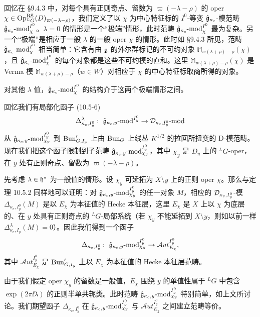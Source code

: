 回忆在 §9.4.3 中，对每个具有正则奇点、留数为 $\varpi(-\lambda-\rho)$ 的 oper $\chi\in\operatorname{Op}^{\mathrm{RS}}_{{}^L G}(D)_{\varpi(-\lambda-\rho)}$，我们定义了以 $\chi$ 为中心特征标的 $I^0$-等变 $\hat{\mathfrak{g}}_{\kappa_c}$-模范畴 $\hat{\mathfrak{g}}_{\kappa_c}\text{-mod}^{I^0}_\chi$。$\lambda=0$ 的情形是一个“极端”情形，此时范畴 $\hat{\mathfrak{g}}_{\kappa_c}\text{-mod}^{I^0}_\chi$ 最为复杂。另一个“极端”是相应于一般 $\lambda$ 的一般 oper $\chi$ 的情形。此时如 §9.4.3 所见，范畴 $\hat{\mathfrak{g}}_{\kappa_c}\text{-mod}^{I^0}_\chi$ 相当简单：它含有由 $\mathfrak{g}$ 的外尔群标记的不可约对象 $\mathbb{M}_{w(\lambda+\rho)-\rho}(\chi)$，且 $\hat{\mathfrak{g}}_{\kappa_c}\text{-mod}^{I^0}_\chi$ 的每个对象都是这些不可约模的直和。这里 $\mathbb{M}_{w(\lambda+\rho)-\rho}(\chi)$ 是 Verma 模 $\mathbb{M}_{w(\lambda+\rho)-\rho}$（$w\in W$）对相应于 $\chi$ 的中心特征标取商所得的对象。

对其他 $\lambda$ 值，$\hat{\mathfrak{g}}_{\kappa_c}\text{-mod}^{I^0}_\chi$ 的结构介于这两个极端情形之间。

回忆我们有局部化函子 (10.5-6)
\[
    \Delta^\lambda_{\kappa_c,I^0_y}:\ \gghat_{\kappa_c,y}\text{-mod}^{I^0_y}
    \to \cD_{\kappa_c,I^0_y}\text{-mod}
\]
从 $\hat{\mathfrak{g}}_{\kappa_c,y}\text{-mod}^{I^0_y}_{\chi_y}$ 到 $\operatorname{Bun}'_{G,I_y}$ 上由 $\operatorname{Bun}_G$ 上线丛 $K^{1/2}$ 的拉回所扭变的 D-模范畴。现在我们把这个函子限制到子范畴 $\hat{\mathfrak{g}}_{\kappa_c,y}\text{-mod}^{I^0_y}_{\chi_y}$，其中 $\chi_y$ 是 $D_y$ 上的 ${}^L G$-oper，在 $y$ 处有正则奇点、留数为 $\varpi(-\lambda-\rho)$。

先考虑 $\lambda\in\mathfrak{h}^*$ 为一般值的情形。设 $\chi_y$ 可延拓为 $X\setminus y$ 上的正则 oper $\chi$。那么与定理 10.5.2 同样地可以证明：对 $\hat{\mathfrak{g}}_{\kappa_c,y}\text{-mod}^{I^0_y}_{\chi_y}$ 的任一对象 $M$，相应的 $\mathcal{D}_{\kappa_c,I^0_y}$-模 $\Delta_{\kappa_c,I^0_y}(M)$ 是以 $E_\chi$ 为本征值的 Hecke 本征层，这里 $E_\chi$ 是 $X$ 上以 $\chi$ 为底层的、在 $y$ 处具有正则奇点的 ${}^L G$-局部系统（若 $\chi_y$ 不能延拓到 $X\setminus y$，则如以前一样 $\Delta^\lambda_{\kappa_c,I_y}(M)=0$）。因此我们得到一个函子
\[
    \Delta_{\kappa_c,I^0_y}:\ \gghat_{\kappa_c,y}\text{-mod}^{I^0_y}_{\chi_y}
    \to \mathcal{A}ut^{I^0_y}_{E_\chi},
\]
其中 $\mathcal{A}ut^{I^0_y}_{E_\chi}$ 是 $\operatorname{Bun}'_{G,I_y}$ 上以 $E_\chi$ 为本征值的 Hecke 本征层范畴。

由于我们假定 oper $\chi_y$ 的留数是一般值，$E_\chi$ 围绕 $y$ 的单值性属于 ${}^L G$ 中包含 $\exp(2\pi\ii\lambda)$ 的正则半单共轭类。此时范畴 $\hat{\mathfrak{g}}_{\kappa_c,y}\text{-mod}^{I^0_y}_{\chi_y}$ 特别简单，如上文所讨论。我们期望函子 $\Delta_{\kappa_c,I^0_y}$ 在 $\hat{\mathfrak{g}}_{\kappa_c,y}\text{-mod}^{I^0_y}_{\chi_y}$ 与 $\mathcal{A}ut^{I^0_y}_{E_\chi}$ 之间建立范畴等价。


